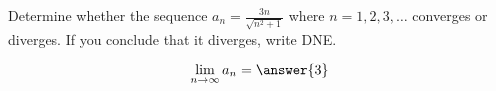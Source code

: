 \documentclass{ximera}
\author{Gregory Hartman \and Matthew Carr}
\begin{document}
\begin{exercise}



Determine whether the sequence $a_n=\frac{3n}{\sqrt{n^2+1}}$ where
  $n=1,2,3,\ldots$ converges or diverges. If you conclude that it
  diverges, write DNE.
  \begin{prompt}
    \[
    \lim_{n\to\infty}a_n=\answer{3}
    \]
  \end{prompt}


\end{exercise}
\end{document}
